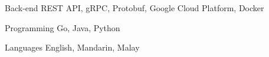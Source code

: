 

\begin{cvskills}

  \cvskill
    {Back-end} %
    {REST API, gRPC, Protobuf, Google Cloud Platform, Docker} %

  \cvskill
    {Programming} %
    {Go, Java, Python} %

  \cvskill
    {Languages} %
    {English, Mandarin, Malay} %

\end{cvskills}
